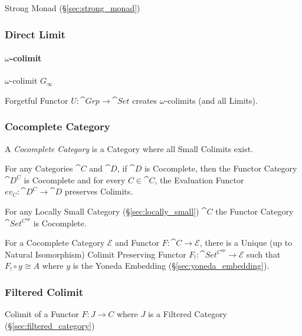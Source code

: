 Strong Monad (\S\ref{sec:strong_monad})



\subsubsection{Direct Limit}\label{sec:direct_limit}

\paragraph{$\omega$-colimit}\label{sec:omega_colimit}\hfill

$\omega$-colimit $G_\infty$

Forgetful Functor $U : \cat{Grp} \rightarrow \cat{Set}$ creates
$\omega$-colimits (and all Limits). \cite{awodey06}



\subsubsection{Cocomplete Category}\label{sec:cocomplete_category}

A \emph{Cocomplete Category} is a Category where all Small Colimits
exist.

For any Categories $\cat{C}$ and $\cat{D}$, if $\cat{D}$ is
Cocomplete, then the Functor Category $\cat{D^C}$ is Cocomplete and
for every $C \in \cat{C}$, the Evaluation Functor $ev_C :
\cat{D^C} \rightarrow \cat{D}$ preserves Colimits.

For any Locally Small Category (\S\ref{sec:locally_small})
$\cat{C}$ the Functor Category $\cat{Set^{C^{op}}}$ is
Cocomplete.

For a Cocomplete Category $\mathcal{E}$ and Functor $F : \cat{C}
\rightarrow \mathcal{E}$, there is a Unique (up to Natural
Isomorphism) Colimit Preserving Functor $F_! : \cat{Set^{C^{op}}}
\rightarrow \mathcal{E}$ such that $F_! \circ y \cong A$ where $y$ is
the Yoneda Embedding (\S\ref{sec:yoneda_embedding}).\cite{awodey06}



\subsubsection{Filtered Colimit}\label{sec:filtered_colimit}

Colimit of a Functor $F : J \to C$ where $J$ is a Filtered Category
(\S\ref{sec:filtered_category})



